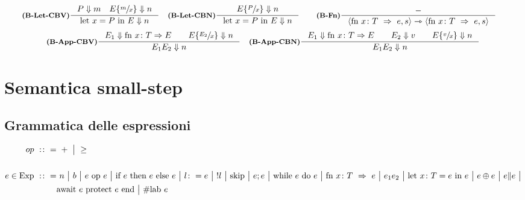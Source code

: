 \documentclass[a4paper, 10pt]{article}
\newcommand{\infer}[4]{\inference[\textbf{#1}]{#2}{#3}#4 }
\newcommand{\bbrule}[2]{ #1 \Downarrow #2}
\newcommand{\srule}[2]{\langle #1 \rangle \rightarrowtriangle \langle #2 \rangle}
\newcommand{\letin}[2]{\text{let } #1 \text{ in } #2}
\newcommand{\subs}[3]{#1 \lbrace \sfrac{#2}{#3} \rbrace}
\begin{document}
	\begin{align*}
		&\infer{(B-Let-CBV)}{\bbrule{P}{m}\quad \bbrule{\subs{E}{m}{x}}{n}}{\bbrule{\letin{x = P}{E}}{n}}{}
		&\infer{(B-Let-CBN)}{\bbrule{\subs{E}{P}{x}}{n}}{\bbrule{\letin{x = P}{E}}{n}}{} \qquad
		&\infer{(B-Fn)}{-}{\srule{\text{fn } x\colon T\ \Rightarrow\ e, s}{\text{fn } x\colon T\ \Rightarrow\ e, s}}{}
	\end{align*}
	\begin{align*}
		&\infer{(B-App-CBV)}{\bbrule{E_1}{\text{fn } x\colon T \Rightarrow E}\qquad \bbrule{\subs{E}{E_2}{x}}{n}}{\bbrule{E_1 E_2}{n}}{}
		&\infer{(B-App-CBN)}{\bbrule{E_1}{\text{fn } x\colon T \Rightarrow E}\qquad \bbrule{E_2}{v}\qquad \bbrule{\subs{E}{v}{x}}{n}}{\bbrule{E_1 E_2}{n}}{}
	\end{align*}

	\newpage
	
\section*{Semantica small-step}
\subsection*{Grammatica delle espressioni}
	\begin{align*}
		op\ :\colon =&\ +\ \big|\ \geq \\ \\
		e\in \textup{Exp}\ :\colon =&\ n\ \big|\ b\ \big|\ e\ \textup{op}\ e\ \big|\ \textup{if}\ e\ \textup{then}\ e\ \textup{else}\ e\ \big|\ l\colon = e\ \big|\ !l\ \big|\ \textup{skip}\ \big|\ e;e\ \big|\ \textup{while}\ e\ \textup{do}\ e\ \big|\ 
		 \text{fn } x\colon T\ \Rightarrow\ e\ \big|\ e_1 e_2\ \big|\  \text{let } x\colon T = e\ \textup{in } e\ \big|\ e\oplus e\ \big|\ e\| e\ \big|\\ 
		 &\textup{await}\ e\ \textup{protect}\ e\ \textup{end}\ \big| \ \# \text{lab } e
	\end{align*}
\end{document}

